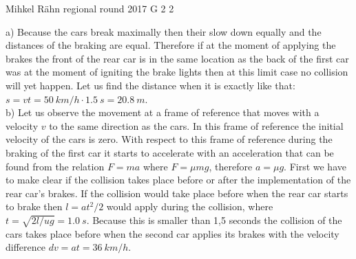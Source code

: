 \documentclass[11pt]{article}
\begin{document}
{Mihkel Rähn} %
{regional round} %
{2017} %
{G 2} %
{2} %
{

\ifEngSolution
a) Because the cars break maximally then their slow down equally and the distances of the braking are equal. Therefore if at the moment of applying the brakes the front of the rear car is in the same location as the back of the first car was at the moment of igniting the brake lights then at this limit case no collision will yet happen. Let us find the distance when it is exactly like that: $s=vt=\SI{50}{km/h}\cdot\SI{1,5}{s}=\SI{20,8}{m}$.\\
b) Let us observe the movement at a frame of reference that moves with a velocity $v$ to the same direction as the cars. In this frame of reference the initial velocity of the cars is zero. With respect to this frame of reference during the braking of the first car it starts to accelerate with an acceleration that can be found from the relation $F=ma$ where $F=\mu mg$, therefore $a=\mu g$. First we have to make clear if the collision takes place before or after the implementation of the rear car’s brakes. If the collision would take place before when the rear car starts to brake then $l=at^2/2$ would apply during the collision, where $t=\sqrt{2l/ug}=\SI{1.0}{s}$. Because this is smaller than 1,5 seconds the collision of the cars takes place before when the second car applies its brakes with the velocity difference $dv=at=\SI{36}{km/h}$.
\fi
}
\end{document}
